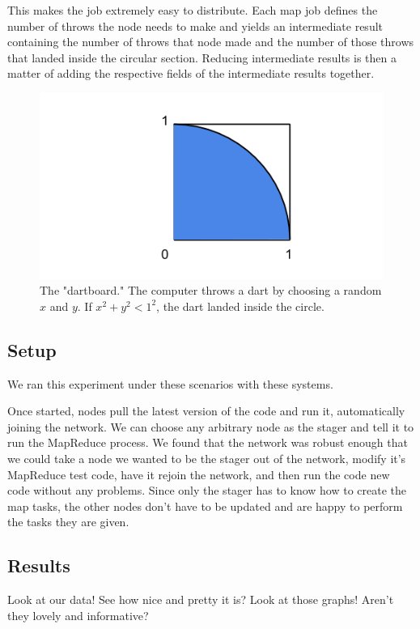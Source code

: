 \documentclass[conference, compsocconf, letterpaper]{IEEEtran}
\begin{document}
This makes the job extremely easy to distribute.  Each map job defines the number of throws the node needs to make and yields an intermediate result containing the number of throws that node made and the number of those throws that landed inside the circular section.  Reducing intermediate results is then a matter of adding the respective fields of the intermediate results together. 

\begin{figure}
    \includegraphics[width=\linewidth]{dartboard}
    \caption{The "dartboard." The computer throws a dart by choosing a random $x$ and $y$.  If $x^{2} + y^{2} < 1^{2} $, the dart landed inside the circle.}
    \label{dartboard}
\end{figure}


\subsection{Setup}
We ran this experiment under these scenarios with these systems.

Once started, nodes pull the latest version of the code and run it, automatically joining the network.  We can choose any arbitrary node as the stager and tell it to run the MapReduce process. We found that the network was robust enough that we could take a node we wanted to be the stager out of the network, modify it's MapReduce test code, have it rejoin the network, and then run the code new code without any problems. Since only the stager has to know how to create the map tasks, the other nodes don't have to be updated and are happy to perform the tasks they are given.

\subsection{Results}
Look at our data! See how nice and pretty it is?  Look at those graphs!  Aren't they lovely and informative? 
\end{document}
